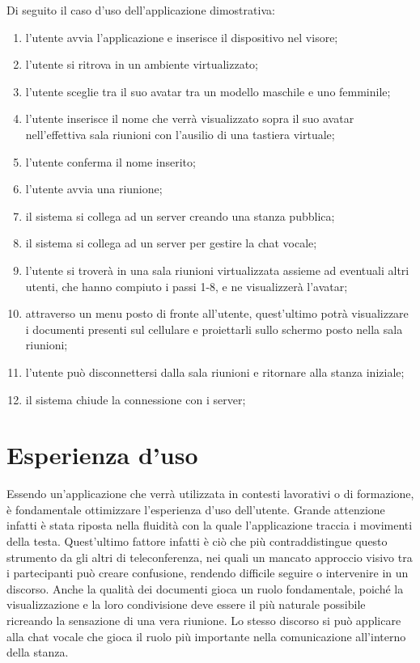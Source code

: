 Di seguito il  caso d'uso dell'applicazione dimostrativa:
\begin{enumerate}
	\item l'utente avvia l'applicazione e inserisce il dispositivo nel visore;
	\item l'utente si ritrova in un ambiente virtualizzato;
	\item l'utente sceglie tra il suo avatar tra un modello maschile e uno femminile;
	\item l'utente inserisce il nome che verrà visualizzato sopra il suo avatar nell'effettiva sala riunioni con l'ausilio di una tastiera virtuale;
	\item l'utente conferma il nome inserito;
	\item l'utente avvia una riunione;
	\item il sistema si collega ad un server creando una stanza pubblica; 
	\item il sistema si collega ad un server per gestire la chat vocale;
	\item l'utente si troverà in una sala riunioni virtualizzata assieme ad eventuali altri utenti, che hanno compiuto i passi 1-8,  e ne visualizzerà l'avatar;
	\item attraverso un menu posto di fronte all'utente, quest'ultimo potrà visualizzare i documenti presenti sul cellulare e proiettarli sullo schermo posto nella sala riunioni;
	\item l'utente può disconnettersi dalla sala riunioni e ritornare alla stanza iniziale;
	\item il sistema chiude la connessione con i server;
\end{enumerate}

\section{Esperienza d'uso}
Essendo un'applicazione che verrà utilizzata in contesti lavorativi o di formazione, è fondamentale ottimizzare l'esperienza d'uso dell'utente. Grande attenzione infatti è stata riposta nella fluidità con la quale l'applicazione traccia i movimenti della testa. Quest'ultimo fattore infatti è ciò che più contraddistingue questo strumento da gli altri di teleconferenza, nei quali un mancato approccio visivo tra i partecipanti può creare confusione, rendendo difficile seguire o intervenire in un discorso. Anche la qualità dei documenti gioca un ruolo fondamentale, poiché la visualizzazione e la loro condivisione deve essere il più naturale possibile ricreando la sensazione di una vera riunione. Lo stesso discorso si può applicare alla chat vocale che gioca il ruolo più importante nella comunicazione all'interno della stanza.
